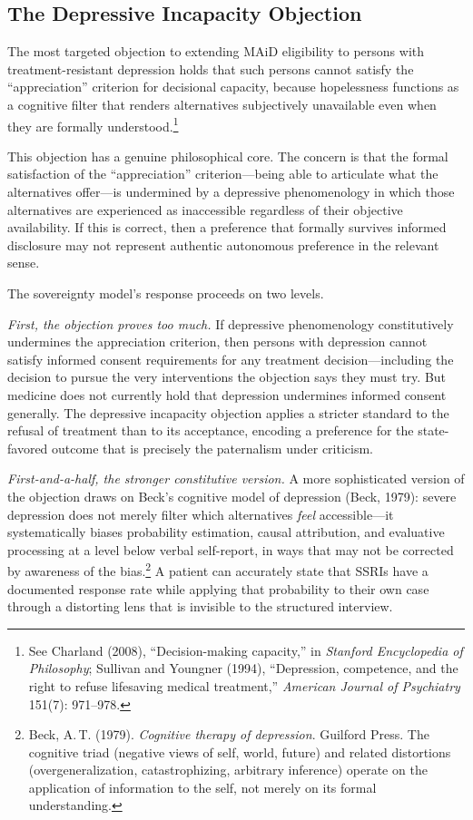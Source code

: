 \documentclass[11pt, letterpaper]{article}
\begin{document}
\subsection{The Depressive Incapacity Objection}

The most targeted objection to extending MAiD eligibility to persons with
treatment-resistant depression holds that such persons cannot satisfy the
``appreciation'' criterion for decisional capacity, because hopelessness functions
as a cognitive filter that renders alternatives subjectively unavailable even when
they are formally understood.\footnote{%
  See Charland (2008), ``Decision-making capacity,'' in
  \textit{Stanford Encyclopedia of Philosophy}; Sullivan and Youngner (1994),
  ``Depression, competence, and the right to refuse lifesaving medical treatment,''
  \textit{American Journal of Psychiatry} 151(7): 971--978.}

This objection has a genuine philosophical core. The concern is that the formal
satisfaction of the ``appreciation'' criterion---being able to articulate what
the alternatives offer---is undermined by a depressive phenomenology in which
those alternatives are experienced as inaccessible regardless of their objective
availability. If this is correct, then a preference that formally survives informed
disclosure may not represent authentic autonomous preference in the relevant sense.

The sovereignty model's response proceeds on two levels.

\textit{First, the objection proves too much.} If depressive phenomenology
constitutively undermines the appreciation criterion, then persons with depression
cannot satisfy informed consent requirements for any treatment decision---including
the decision to pursue the very interventions the objection says they must try.
But medicine does not currently hold that depression undermines informed consent
generally. The depressive incapacity objection applies a stricter standard to the
refusal of treatment than to its acceptance, encoding a preference for the
state-favored outcome that is precisely the paternalism under criticism.

\textit{First-and-a-half, the stronger constitutive version.} A more sophisticated version
of the objection draws on Beck's cognitive model of depression (Beck, 1979): severe
depression does not merely filter which alternatives \textit{feel} accessible---it
systematically biases probability estimation, causal attribution, and evaluative
processing at a level below verbal self-report, in ways that may not be corrected by
awareness of the bias.\footnote{%
  Beck, A.\,T. (1979). \textit{Cognitive therapy of depression}. Guilford Press.
  The cognitive triad (negative views of self, world, future) and related distortions
  (overgeneralization, catastrophizing, arbitrary inference) operate on the application
  of information to the self, not merely on its formal understanding.}
A patient can accurately state that SSRIs have a documented response rate while applying
that probability to their own case through a distorting lens that is invisible to the
structured interview.
\end{document}
